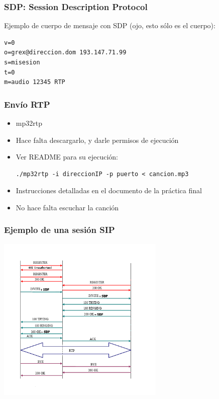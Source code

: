 \documentclass{beamer}
\begin{document}

\begin{frame}[fragile]
\frametitle{SDP: Session Description Protocol}

Ejemplo de cuerpo de mensaje con SDP (ojo, esto sólo es el cuerpo):

\begin{verbatim}
v=0
o=grex@direccion.dom 193.147.71.99
s=misesion
t=0 
m=audio 12345 RTP
\end{verbatim}

\end{frame} 


\begin{frame}[fragile]
\frametitle{Envío RTP}

\begin{itemize}
  \item mp32rtp
  \item Hace falta descargarlo, y darle permisos de ejecución
  \item Ver README para su ejecución: 

\begin{verbatim}
./mp32rtp -i direccionIP -p puerto < cancion.mp3
\end{verbatim}
  \item Instrucciones detalladas en el documento de la práctica final
  \item No hace falta escuchar la canción
\end{itemize}

\end{frame} 


\begin{frame}
\frametitle{Ejemplo de una sesión SIP}

\begin{center}
  \includegraphics[width=8cm]{figs/complete-sip-session.png}
\end{center}


\end{frame}
\end{document}

